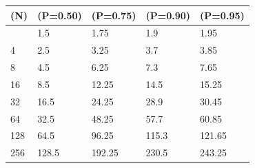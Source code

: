 \documentclass[11pt]{article}
\begin{document}
{\def\LTcaptype{none} %
\begin{longtable}[]{@{}lllll@{}}
\toprule\noalign{}
(N) & (P=0.50) & (P=0.75) & (P=0.90) & (P=0.95) \\
\midrule\noalign{}
\endhead
\bottomrule\noalign{}
\endlastfoot
2 & 1.5 & 1.75 & 1.9 & 1.95 \\
4 & 2.5 & 3.25 & 3.7 & 3.85 \\
8 & 4.5 & 6.25 & 7.3 & 7.65 \\
16 & 8.5 & 12.25 & 14.5 & 15.25 \\
32 & 16.5 & 24.25 & 28.9 & 30.45 \\
64 & 32.5 & 48.25 & 57.7 & 60.85 \\
128 & 64.5 & 96.25 & 115.3 & 121.65 \\
256 & 128.5 & 192.25 & 230.5 & 243.25 \\
\end{longtable}
}
\end{document}
